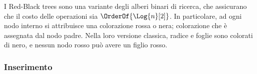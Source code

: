 \documentclass{subfiles}
\begin{document}
I Red-Black trees sono una variante degli alberi binari di ricerca, che assicurano che il costo delle operazioni sia \(\OrderOf{\Log{n}[2]}\).
In particolare, ad ogni nodo interno si attribuisce una colorazione rossa o nera; colorazione che è assegnata dal nodo padre.
Nella loro versione classica, radice e foglie sono colorati di nero, e nessun nodo rosso può avere un figlio rosso.

\subsubsection{Inserimento}

\end{document}
